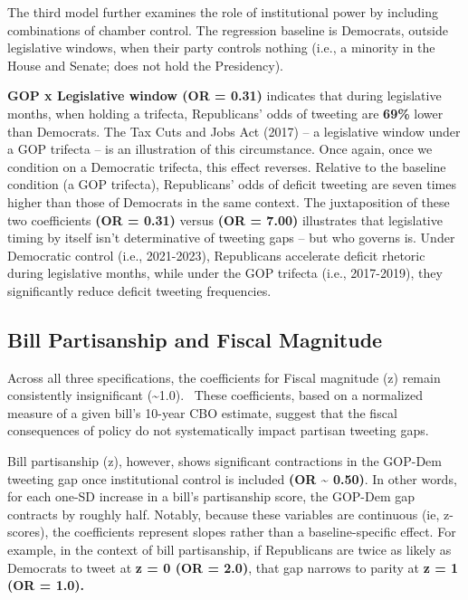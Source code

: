 \documentclass[
]{article}
\begin{document}
\FloatBarrier

The third model further examines the role of institutional power by
including combinations of chamber control. The regression baseline is
Democrats, outside legislative windows, when their party controls
nothing (i.e., a minority in the House and Senate; does not hold the
Presidency).

\textbf{GOP x Legislative window (OR = 0.31)} indicates that during
legislative months, when holding a trifecta, Republicans' odds of
tweeting are \textbf{69\%} lower than Democrats. The Tax Cuts and Jobs
Act (2017) -- a legislative window under a GOP trifecta -- is an
illustration of this circumstance. Once again, once we condition on a
Democratic trifecta, this effect reverses. Relative to the baseline
condition (a GOP trifecta), Republicans' odds of deficit tweeting are
seven times higher than those of Democrats in the same context. The
juxtaposition of these two coefficients \textbf{(OR = 0.31)} versus
\textbf{(OR = 7.00)} illustrates that legislative timing by itself isn't
determinative of tweeting gaps -- but who governs is. Under Democratic
control (i.e., 2021-2023), Republicans accelerate deficit rhetoric
during legislative months, while under the GOP trifecta (i.e.,
2017-2019), they significantly reduce deficit tweeting frequencies.

\subsection{\texorpdfstring{\textbf{Bill Partisanship and Fiscal
Magnitude}}{Bill Partisanship and Fiscal Magnitude}}\label{bill-partisanship-and-fiscal-magnitude}

Across all three specifications, the coefficients for Fiscal magnitude
(z) remain consistently insignificant (\textasciitilde1.0).~ These
coefficients, based on a normalized measure of a given bill's 10-year
CBO estimate, suggest that the fiscal consequences of policy do not
systematically impact partisan tweeting gaps.

Bill partisanship (z), however, shows significant contractions in the
GOP-Dem tweeting gap once institutional control is included \textbf{(OR
\textasciitilde{} 0.50)}. In other words, for each one-SD increase in a
bill's partisanship score, the GOP-Dem gap contracts by roughly half.
Notably, because these variables are continuous (ie, z-scores), the
coefficients represent slopes rather than a baseline-specific effect.
For example, in the context of bill partisanship, if Republicans are
twice as likely as Democrats to tweet at \textbf{z = 0 (OR = 2.0)}, that
gap narrows to parity at \textbf{z = 1 (OR = 1.0).}

\FloatBarrier
\end{document}

